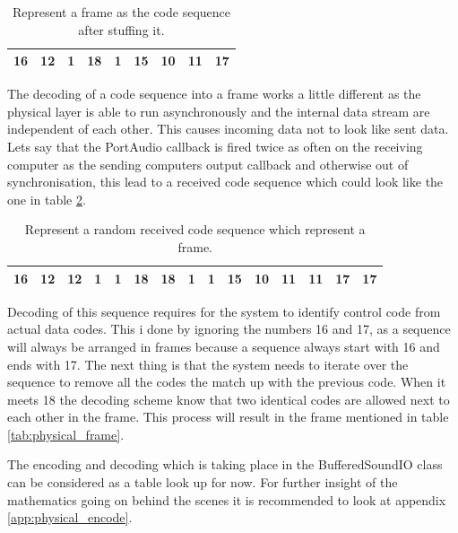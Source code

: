 	\begin{table}[htb]
		\begin{center}
			\begin{tabular}{|c|c|c|c|c|c|c|c|c|}
			\hline
			16 & 12 & 1 & 18 & 1 & 15 & 10 & 11 & 17 \\
			\hline
			\end{tabular}
		\end{center}
		\caption{Represent a frame as the code sequence after stuffing it.}
		\label{tab:physical_stuffed_frame}
	\end{table}
	
	The decoding of a code sequence into a frame works a little different as the physical layer is able to run asynchronously and the internal data stream are independent of each other. This causes incoming data not to look like sent data. Lets say that the PortAudio callback is fired twice as often on the receiving computer as the sending computers output callback and otherwise out of synchronisation, this lead to a received code sequence which could look like the one in table \ref{tab:physical_received_frame}.
	
	\begin{table}[htb]
		\begin{center}
			\begin{tabular}{|c|c|c|c|c|c|c|c|c|c|c|c|c|c|c|}
			\hline
			16 & 12 & 12 & 1 & 1 & 18 & 18 & 1 & 1 & 15 & 10 & 11 & 11 & 17 & 17 \\
			\hline
			\end{tabular}
		\end{center}
		\caption{Represent a random received code sequence which represent a frame.}
		\label{tab:physical_received_frame}
	\end{table}
	
	Decoding of this sequence requires for the system to identify control code from actual data codes. This i done by ignoring the numbers 16 and 17, as a sequence will always be arranged in frames because a sequence always start with 16 and ends with 17. The next thing is that the system needs to iterate over the sequence to remove all the codes the match up with the previous code. When it meets 18 the decoding scheme know that two identical codes are allowed next to each other in the frame. This process will result in the frame mentioned in table \ref{tab:physical_frame}.
	
	The encoding and decoding which is taking place in the BufferedSoundIO class can be considered as a table look up for now. For further insight of the mathematics going on behind the scenes it is recommended to look at appendix \ref{app:physical_encode}.